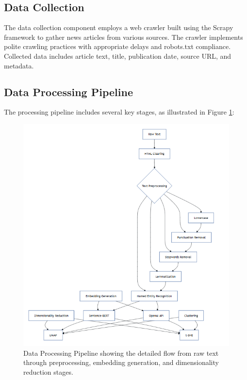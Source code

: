\documentclass[conference]{IEEEtran}
\begin{document}
\subsection{Data Collection}
The data collection component employs a web crawler built using the Scrapy framework \citep{scrapy2021} to gather news articles from various sources. The crawler implements polite crawling practices with appropriate delays and robots.txt compliance. Collected data includes article text, title, publication date, source URL, and metadata.

\subsection{Data Processing Pipeline}
The processing pipeline includes several key stages, as illustrated in Figure \ref{fig:dataflow}:

\begin{figure}[!t]
\centering
\includegraphics[width=\textwidth]{images/system-diagram.png}
\caption{Data Processing Pipeline showing the detailed flow from raw text through preprocessing, embedding generation, and dimensionality reduction stages.}
\label{fig:dataflow}
\end{figure}
\end{document}
